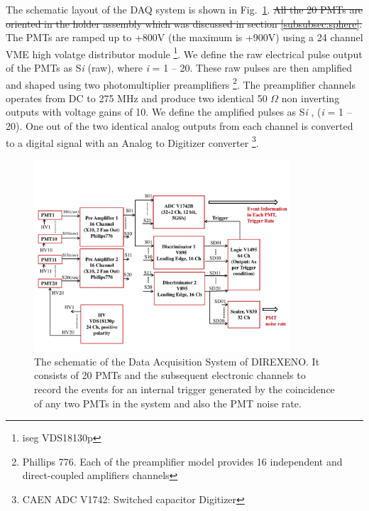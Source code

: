 The schematic layout of the DAQ system is shown in Fig.~{\ref{Fig:DAQscheme}}. \sout{All the 20 PMTs are oriented in the holder assembly which was discussed in section \ref{subsubsec:sphere}.} The PMTs are ramped up to +800V (the maximum is +900V) using a 24 channel VME high volatge distributor module \footnote{iseg VDS18130p}. We define the raw electrical pulse output of the PMTs as S{\it i} (raw), where {\it i} = 1 -- 20. 
These raw pulses are then amplified and shaped using two photomultiplier preamplifiers \footnote{Phillips 776. Each of the preamplifier model provides 16 independent and direct-coupled amplifiers channels}. The preamplifier channels operates from DC to 275 MHz and produce two identical 50 $\Omega$ non inverting outputs with voltage gains of 10.  We define the amplified pulses as S{\it i} , ({\it i} = 1 -- 20). One out of the two identical analog outputs from each channel is converted to a digital signal with an Analog to Digitizer converter \footnote{CAEN ADC V1742: Switched capacitor Digitizer}. 
\begin{figure}[h]
   \centering
   \includegraphics[width=0.85\textwidth]{DAQscheme.pdf}
   \caption{The schematic of the Data Acquisition System of DIREXENO. It 
        consists of 20 PMTs and the subsequent electronic channels to record 
        the events for an internal trigger generated by the coincidence of any 
        two PMTs in the system and also the PMT noise rate.}
   \label{Fig:DAQscheme}
\end{figure}

